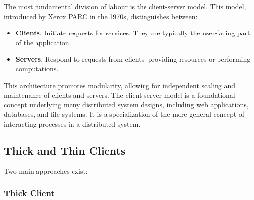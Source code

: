 The most fundamental division of labour is the client-server model.  This model, introduced by Xerox PARC in the 1970s, distinguishes between:

\begin{itemize}[itemsep=1pt]
    \item \textbf{Clients}:  Initiate requests for services.  They are typically the user-facing part of the application.
    \item \textbf{Servers}:  Respond to requests from clients, providing resources or performing computations.
\end{itemize}

\noindent This architecture promotes modularity, allowing for independent scaling and maintenance of clients and servers.  The client-server model is a foundational concept underlying many distributed system designs, including web applications, databases, and file systems.  It is a specialization of the more general concept of interacting processes in a distributed system.

\subsection{Thick and Thin Clients}

Two main approaches exist:

\subsubsection{Thick Client}

